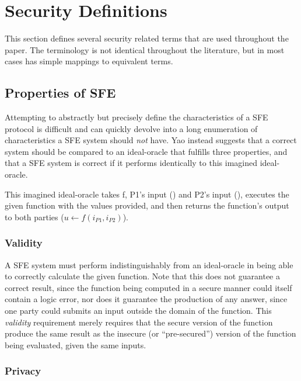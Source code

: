 \section{Security Definitions}
\label{sec:definitions}

This section defines several security related terms that are used throughout the paper.  The terminology is not identical throughout the literature, but in most cases has simple mappings to equivalent terms.


\subsection{Properties of \ac{SFE}}

Attempting to abstractly but precisely define the characteristics of a \ac{SFE} protocol is difficult and can quickly devolve into a long enumeration of characteristics a \ac{SFE} system should \emph{not} have.  Yao instead suggests\cite{yao1986generate} that a correct system should be compared to an ideal-oracle that fulfills three properties, and that a \ac{SFE} system is correct if it performs identically to this imagined ideal-oracle.

This imagined ideal-oracle takes \ac{f}, \ac{P1}'s input (\ponein) and \ac{P2}'s input (\ptwoin), executes the given function with the values provided, and then returns the function's output to both parties ($u \leftarrow f(i_{P1}, i_{P2})$).


\subsubsection{Validity}

A \ac{SFE} system must perform indistinguishably from an ideal-oracle in being able to correctly calculate the given function. Note that this does not guarantee a correct result, since the function being computed in a secure manner could itself contain a logic error, nor does it guarantee the production of any answer, since one party could submits an input outside the domain of the function. This \emph{validity} requirement merely requires that the secure version of the function produce the same result as the insecure (or ``pre-secured'') version of the function being evaluated, given the same inputs.


\subsubsection{Privacy}

